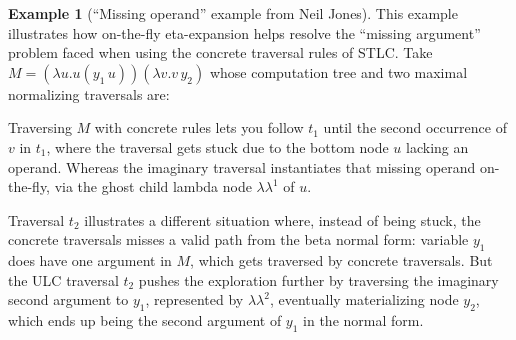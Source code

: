 \documentclass{elsarticle}
\theoremstyle{plain}
\theoremstyle{definition}
\newtheorem{example}{Example}[section]
\theoremstyle{remark}
\newcommand{\ghostlmd}{{\lambda\!\!\lambda}}
\newcommand{\ghostvar}{\theta}
\begin{document}
\begin{example}[``Missing operand'' example from Neil Jones]
\label{ex:missingoperand}
This example illustrates how on-the-fly eta-expansion helps resolve the ``missing argument'' problem faced when using the concrete traversal rules of STLC. Take $M = (\lambda u . u (y_1\,u)) (\lambda v . v\, y_2)$ whose computation tree  and two maximal normalizing traversals are:


Traversing $M$ with concrete rules lets you follow $t_1$ until the second occurrence of $v$ in $t_1$, where the traversal gets stuck due to the bottom node $u$ lacking an operand. Whereas the imaginary traversal instantiates that missing operand on-the-fly, via the ghost child lambda node $\ghostlmd^1$ of $u$.

Traversal $t_2$ illustrates a different situation where, instead of being stuck, the concrete traversals misses a valid path from the beta normal form: variable $y_1$ does have one argument in $M$, which gets traversed by concrete traversals. But the ULC traversal $t_2$ pushes the exploration further by traversing the imaginary second argument to $y_1$, represented by $\ghostlmd^2$, eventually materializing node $y_2$, which ends up being the second argument of $y_1$ in the normal form.


\end{example}
\end{document}
